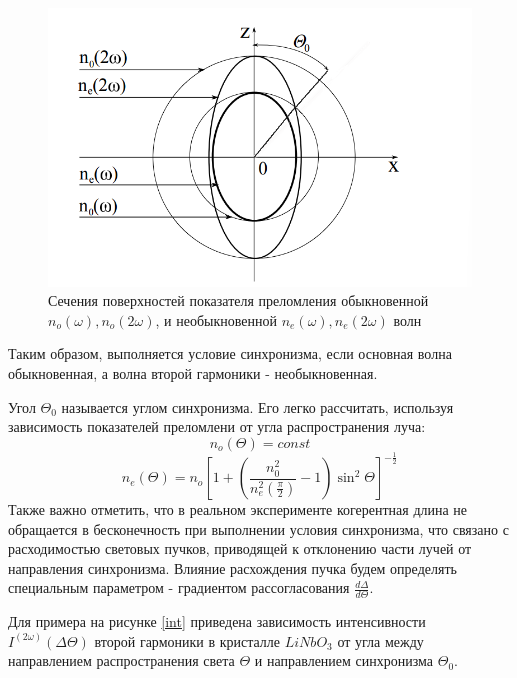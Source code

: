 \documentclass[a4paper,12pt]{article} %
\begin{document}
\begin{figure}[H]
\centering
\includegraphics[scale=1]{pic3.png}
\caption{Сечения поверхностей показателя преломления обыкновенной $n_o(\omega), n_o(2\omega)$, и необыкновенной $n_e(\omega), n_e(2\omega)$ волн}
\label{refl}
\end{figure}

Таким образом, выполняется условие синхронизма, если основная волна обыкновенная, а волна второй гармоники - необыкновенная.

Угол $\Theta_0$ называется углом синхронизма. Его легко рассчитать, используя зависимость показателей преломлени от угла распространения луча:
\begin{equation}
n_o(\Theta) = const
\end{equation}
\begin{equation}
n_e(\Theta) = n_o \left[ 1 + \left(\frac{n^2_0}{n^2_e(\frac{\pi}{2})} - 1\right) \sin^2 \Theta \right]^{-\frac{1}{2}}
\end{equation}
Также важно отметить, что в реальном эксперименте когерентная длина не обращается в бесконечность при выполнении условия синхронизма, что связано с расходимостью световых пучков, приводящей к отклонению части лучей от направления синхронизма. Влияние расхождения пучка будем определять специальным параметром - градиентом рассогласования $\frac{d \Delta}{d \Theta}$.

Для примера на рисунке \ref{int} приведена зависимость интенсивности $I^{(2\omega)}(\Delta \Theta)$ второй гармоники в кристалле $LiNbO_3$ от угла между направлением распространения света $\Theta$ и направлением синхронизма $\Theta_0$.
\end{document}
